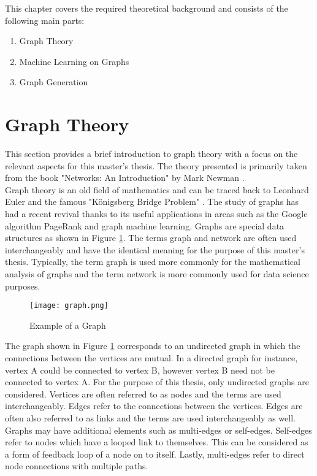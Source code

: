 
	This chapter covers the required theoretical background and consists 
	of the following main parts:

	\begin{enumerate}
		\item Graph Theory
		\item Machine Learning on Graphs
		\item Graph Generation
    \end{enumerate}

	\section{Graph Theory}

	This section provides a brief introduction to graph theory with a focus on
	the relevant aspects for this master's thesis. The theory presented is
	primarily taken from the book "Networks: An Introduction" by Mark Newman
	\citeyearpar{Newman2010}. \\

	\noindent Graph theory is an old field of mathematics and can be traced back 
	to Leonhard Euler and the famous "Königsberg Bridge Problem"
	\citep{euler1741solutio}. The study of graphs has had a recent revival
	thanks to its useful applications in areas such as the Google algorithm
	PageRank \cite{page1999pagerank} and graph machine learning. Graphs are 
	special data structures as shown in Figure \ref{fig:graph}. The terms graph 
	and network are often used interchangeably and have the identical meaning 
	for the purpose of this master's thesis. Typically, the term graph is used 
	more commonly for the mathematical analysis of graphs and the term network 
	is more commonly used for data science purposes. \\

	\begin{figure}[h]
		\centering
		\texttt{[image: graph.png]}
		\caption{Example of a Graph}
		\cite[p. 111]{Newman2010}
		\label{fig:graph}
	\end{figure}
	
	\noindent The graph shown in Figure \ref{fig:graph} corresponds to an 
	undirected graph in which the connections between the vertices are mutual. 
	In a directed graph for instance, vertex A could be connected to vertex B, 
	however vertex B need not be connected to vertex A. For the purpose of this 
	thesis, only undirected graphs are considered. Vertices are often referred 
	to as nodes and the terms are used interchangeably. Edges refer to the
	connections between the vertices. Edges are often also referred to as links
	and the terms are used interchangeably as well. Graphs may have additional 
	elements such as multi-edges or self-edges. Self-edges refer to
	nodes which have a looped link to themselves. This can be considered as a
	form of feedback loop of a node on to itself. Lastly, multi-edges refer to 
	direct node connections with multiple paths. \\

